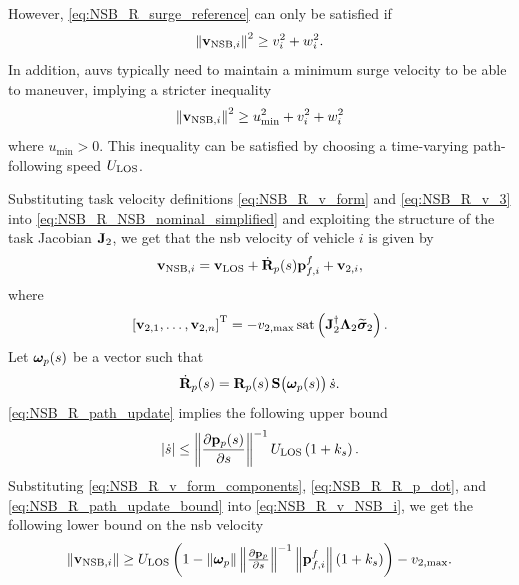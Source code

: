 \noindent However, \eqref{eq:NSB_R_surge_reference} can only be satisfied if 
\begin{equation}
    \left\|\mathbf{v}_{{\rm NSB}, i}\right\|^2 \geq v_i^2 + w_i^2.
\end{equation}
In addition, \glspl{auv} typically need to maintain a minimum surge velocity to be able to maneuver, implying a stricter inequality 
\begin{equation}
    \left\|\mathbf{v}_{{\rm NSB}, i}\right\|^2 \geq u_{\min}^2 + v_i^2 + w_i^2
    \label{eq:NSB_R_NSB_speed_condition}
\end{equation}
where $u_{\min} > 0$.
This inequality can be satisfied by choosing a time-varying path-following speed $U_{\rm LOS}$.



Substituting task velocity definitions \eqref{eq:NSB_R_v_form} and \eqref{eq:NSB_R_v_3} into \eqref{eq:NSB_R_NSB_nominal_simplified} and exploiting the structure of the task Jacobian $\mathbf{J}_2$, we get that the \gls{nsb} velocity of vehicle $i$ is given by 
\begin{equation}
    \ivel_{{\rm NSB}, i} = \ivel_{\rm LOS} + \dot{\mat{R}}_p(s)\mat{p}_{f,i}^f + \ivel_{2,i}, \label{eq:NSB_R_v_NSB_i}
    \vspace*{-0.55em}
\end{equation}
where 
\begin{equation}
    \left[\mathbf{v}_{2, 1}, \ldots, \mathbf{v}_{2, n}\right]^{\mathrm{T}} = 
    - v_{2, \max}\,{\rm sat}\left(\mathbf{J}_2^{\dagger}\bm{\Lambda}_2 \widetilde{\bm{\sigma}}_2\right). \label{eq:NSB_R_v_form_components}
\end{equation}
Let $\bm{\omega}_p(s)$ be a vector such that 
\begin{equation}
    \dot{\mathbf{R}}_p(s) = \mathbf{R}_p(s)\,\mathbf{S}\bigl(\bm{\omega}_p(s)\bigr)\,\dot{s}. \label{eq:NSB_R_R_p_dot}
\end{equation}
\eqref{eq:NSB_R_path_update} implies the following upper bound 
\begin{equation}
    \left|\dot{s}\right| \leq \left\|\frac{\partial \mathbf{p}_p(s)}{\partial s}\right\|^{-1} U_{\rm LOS} \left(1 + k_{s}\right). \label{eq:NSB_R_path_update_bound}
\end{equation}
Substituting \eqref{eq:NSB_R_v_form_components}, \eqref{eq:NSB_R_R_p_dot}, and \eqref{eq:NSB_R_path_update_bound} into \eqref{eq:NSB_R_v_NSB_i}, we get the following lower bound on the \gls{nsb} velocity 
\begin{equation}
    \norm{\ivel_{{\rm NSB}, i}} \geq U_{\rm LOS} \left(1
        - \norm{\bs{\omega}_p}\norm{\scale[1]{\frac{\partial \mat{p}_p}{\partial s}}}^{-1}\norm{\mat{p}_{f, i}^f} \left(1 + k_{s}\right)\right) - \ivels_{2, \max}.
\end{equation}
